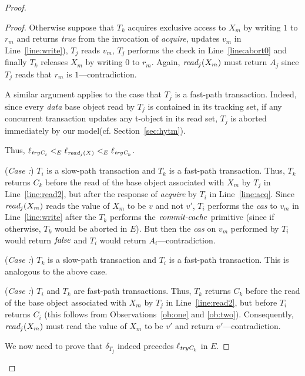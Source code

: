 \begin{proof}
\begin{proof}
Otherwise suppose that $T_k$ acquires exclusive access to $X_m$ by writing $1$ to $r_{m}$ and returns \emph{true}
from the invocation of \emph{acquire}, updates $v_m$ in Line~\ref{line:write}), 
$T_j$ reads $v_m$, $T_j$ performs the check in Line~\ref{line:abort0} and finally $T_k$ 
releases $X_m$ by writing $0$ to $r_{m}$. 
Again, $\textit{read}_j(X_m)$ must return $A_j$ since $T_j$ reads that $r_{m}$ is $1$---contradiction.

A similar argument applies to the case that $T_j$ is a fast-path transaction.
Indeed, since every \emph{data} base object read by $T_j$ is contained in its tracking set, if any concurrent
transaction updates any t-object in its read set, $T_j$ is aborted immediately by our model(cf. Section~\ref{sec:hytm}).

Thus, $\ell_{\textit{tryC}_i} <_E \ell_{\textit{read}_j(X)} <_{E} \ell_{\textit{tryC}_k}$.

(\textit{Case :}) $T_i$ is a slow-path transaction and $T_k$ is a fast-path transaction.
Thus, $T_k$ returns $C_k$ 
before the read of the base object associated with $X_m$ by $T_j$ in Line~\ref{line:read2}, but after the response
of \emph{acquire} by $T_i$ in Line~\ref{line:acq}.
Since $\textit{read}_j(X_m)$ reads the value of $X_m$ to be $v$ and not $v'$, $T_i$ performs the \emph{cas}
to $v_m$ in Line~\ref{line:write} after the $T_k$ performs the $\ms{commit-cache}$ primitive (since if
otherwise, $T_k$ would be aborted in $E$).
But then the \emph{cas} on $v_m$ performed by $T_i$ would return $\mathit{false}$ and $T_i$ would return $A_i$---contradiction.

(\textit{Case :}) $T_k$ is a slow-path transaction and $T_i$ is a fast-path transaction.
This is analogous to the above case.

(\textit{Case :}) $T_i$ and $T_k$ are fast-path transactions.
Thus, $T_k$ returns $C_k$ 
before the read of the base object associated with $X_m$ by $T_j$ in Line~\ref{line:read2}, but before $T_i$
returns $C_i$ (this follows from Observations~\ref{ob:one} and \ref{ob:two}).
Consequently, $\textit{read}_j(X_m)$ must read the value of $X_m$ to be $v'$ and return $v'$---contradiction.
%

We now need to prove that $\delta_{T_{j}}$ indeed precedes $\ell_{\textit{tryC}_k}$ in $E$.


\end{proof}
\end{proof}
